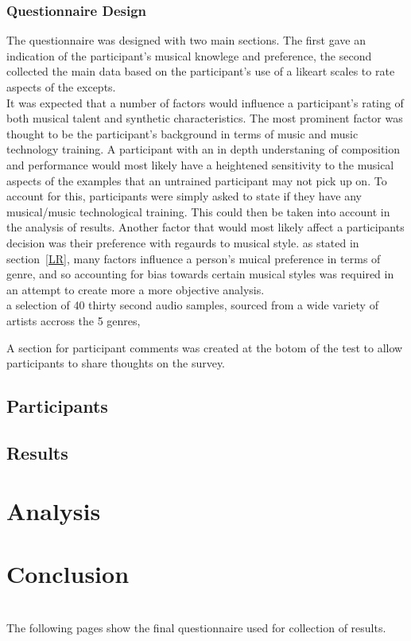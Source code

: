 \documentclass[titlepage]{scrartcl}
\begin{document}
    \subsubsection{Questionnaire Design}
    The questionnaire was designed with two main sections. The first gave an
    indication of the participant's musical knowlege and preference, the second
    collected the main data based on the participant's use of a likeart scales
    to rate aspects of the excepts.\\
    It was expected that a number of factors would influence a participant's
    rating of both musical talent and synthetic characteristics. The most
    prominent factor was thought to be the participant's background in terms of
    music and music technology training. A participant with an in depth
    understaning of composition and performance would most likely have a
    heightened sensitivity to the musical aspects of the examples that an
    untrained participant may not pick up on. To account for this, participants
    were simply asked to state if they have any musical/music technological
    training. This could then be taken into account in the analysis of results.
    Another factor that would most likely affect a participants decision was
    their preference with regaurds to musical style. as stated in
    section~\ref{LR}, many factors influence a person's muical preference in
    terms of genre, and so accounting for bias towards certain musical styles
    was required in an attempt to create more a more objective analysis.\\

    a selection of 40 thirty second audio samples, sourced from a wide variety of artists accross the 5 genres, 

    A section for participant comments was created at the botom of the test to
    allow participants to share thoughts on the survey.

    \subsection{Participants}
    \subsection{Results}

    \section{Analysis}

    \section{Conclusion}
    
    \printbibliography

    \appendix
    \gdef\thesection{\centerline{Appendix \Alph{section}}}
    \section{}
    The following pages show the final questionnaire used for collection of results. 
    
\end{document}
